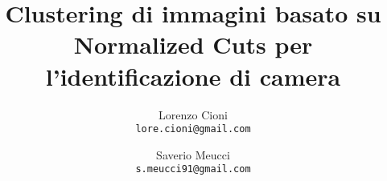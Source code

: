 \documentclass[10pt,twocolumn,letterpaper]{article}
\begin{document}
\title{Clustering di immagini basato su Normalized Cuts per l'identificazione di camera}

\author{Lorenzo Cioni\\
{\tt\small lore.cioni@gmail.com}
\and
Saverio Meucci\\
{\tt\small s.meucci91@gmail.com}
}

\maketitle
\thispagestyle{empty}












{\small


}
\end{document}
